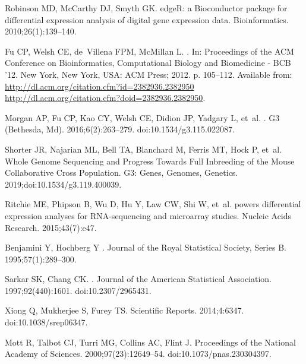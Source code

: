 \documentclass[10pt,letterpaper]{article}
\begin{document}
\begin{thebibliography}{10}
Robinson MD, McCarthy DJ, Smyth GK.
\newblock edgeR: a Bioconductor package for differential expression analysis of
  digital gene expression data.
\newblock Bioinformatics. 2010;26(1):139--140.

Fu CP, Welsh CE, de~Villena FPM, McMillan L.
.
\newblock In: Proceedings of the ACM Conference on Bioinformatics,
  Computational Biology and Biomedicine - BCB '12. New York, New York, USA: ACM
  Press; 2012. p. 105--112.
\newblock Available from:
  \url{http://dl.acm.org/citation.cfm?id=2382936.2382950
  http://dl.acm.org/citation.cfm?doid=2382936.2382950}.

Morgan AP, Fu CP, Kao CY, Welsh CE, Didion JP, Yadgary L, et~al.
.
\newblock G3 (Bethesda, Md). 2016;6(2):263--279.
\newblock doi:{10.1534/g3.115.022087}.

Shorter JR, Najarian ML, Bell TA, Blanchard M, Ferris MT, Hock P, et~al.
\newblock Whole Genome Sequencing and Progress Towards Full Inbreeding of the
  Mouse Collaborative Cross Population.
\newblock G3: Genes, Genomes, Genetics. 2019;doi:{10.1534/g3.119.400039}.

Ritchie ME, Phipson B, Wu D, Hu Y, Law CW, Shi W, et~al.
 powers differential expression analyses for {RNA}-sequencing
  and microarray studies.
\newblock Nucleic Acids Research. 2015;43(7):e47.

Benjamini Y, Hochberg Y
.
\newblock Journal of the Royal Statistical Society, Series B.
  1995;57(1):289--300.

Sarkar SK, Chang CK.
.
\newblock Journal of the American Statistical Association. 1997;92(440):1601.
\newblock doi:{10.2307/2965431}.

Xiong Q, Mukherjee S, Furey TS.
\newblock Scientific Reports. 2014;4:6347.
\newblock doi:{10.1038/srep06347}.

Mott R, Talbot CJ, Turri MG, Collins AC, Flint J.
\newblock Proceedings of the National Academy of Sciences.
  2000;97(23):12649--54.
\newblock doi:{10.1073/pnas.230304397}.


\end{thebibliography}
\end{document}
